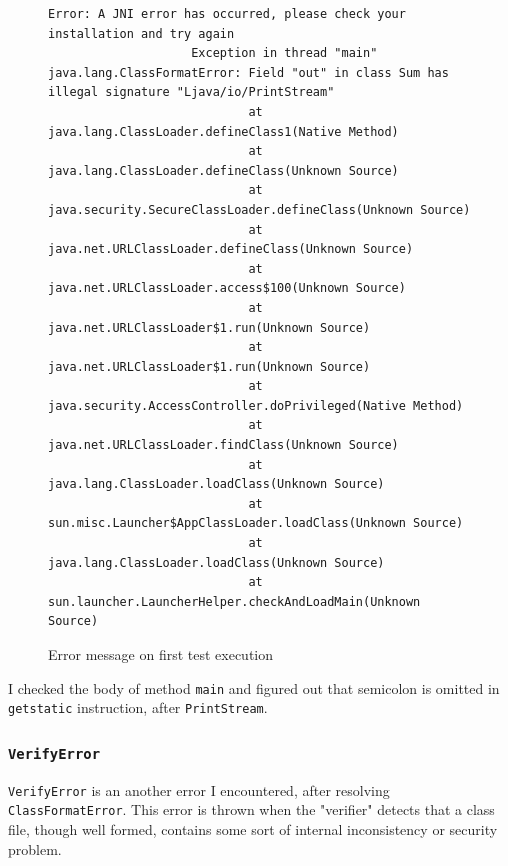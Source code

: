 \documentclass[a4paper, 12pt]{article}
\begin{document}
            \begin{figure}[H]
                \begin{lstlisting}[gobble=20]
                    Error: A JNI error has occurred, please check your installation and try again
                    Exception in thread "main" java.lang.ClassFormatError: Field "out" in class Sum has illegal signature "Ljava/io/PrintStream"
                            at java.lang.ClassLoader.defineClass1(Native Method)
                            at java.lang.ClassLoader.defineClass(Unknown Source)
                            at java.security.SecureClassLoader.defineClass(Unknown Source)
                            at java.net.URLClassLoader.defineClass(Unknown Source)
                            at java.net.URLClassLoader.access$100(Unknown Source)
                            at java.net.URLClassLoader$1.run(Unknown Source)
                            at java.net.URLClassLoader$1.run(Unknown Source)
                            at java.security.AccessController.doPrivileged(Native Method)
                            at java.net.URLClassLoader.findClass(Unknown Source)
                            at java.lang.ClassLoader.loadClass(Unknown Source)
                            at sun.misc.Launcher$AppClassLoader.loadClass(Unknown Source)
                            at java.lang.ClassLoader.loadClass(Unknown Source)
                            at sun.launcher.LauncherHelper.checkAndLoadMain(Unknown Source)
                \end{lstlisting}
        
                \centering        
                \caption{Error message on first test execution}
            \end{figure}

            I checked the body of method \texttt{main} and figured out that semicolon is omitted in \texttt{getstatic} instruction, after \texttt{PrintStream}.
    
            \subsubsection{\texttt{VerifyError}}
            \texttt{VerifyError} is an another error I encountered, after resolving \texttt{ClassFormatError}. This error is thrown when the "verifier" detects that a class file, though well formed, contains some sort of internal inconsistency or security problem. \cite{oracle_ve}
    
\end{document}
